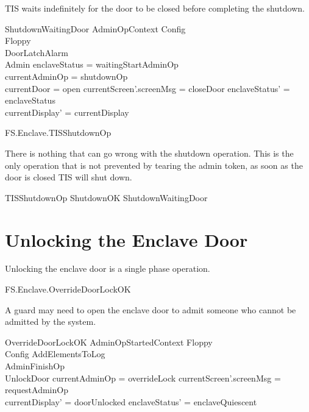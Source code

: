 TIS waits indefinitely for the door to be closed before completing the
shutdown. 

\begin{schema}{ShutdownWaitingDoor}
        AdminOpContext
\also   
        \Xi Config
\\      \Xi Floppy
\\      \Xi DoorLatchAlarm
\\      \Xi Admin
\where
        enclaveStatus = waitingStartAdminOp
\\      \The currentAdminOp = shutdownOp
\\      currentDoor = open
\also
        currentScreen'.screenMsg = closeDoor
\also
        enclaveStatus' = enclaveStatus
\\      currentDisplay' = currentDisplay
\end{schema}

\begin{traceunit}{FS.Enclave.TISShutdownOp}
\end{traceunit}

There is nothing that can go wrong with the shutdown operation. This
is the only operation that is not prevented by tearing the admin
token, as soon as the door is closed TIS will shut down.

\begin{zed}
        TISShutdownOp  ShutdownOK \lor ShutdownWaitingDoor
\end{zed}

\section{Unlocking the Enclave Door}

Unlocking the enclave door is a single phase operation.

\begin{traceunit}{FS.Enclave.OverrideDoorLockOK}
\end{traceunit}

A guard may need to open the enclave door to admit someone who cannot
be admitted by the system.

\begin{schema}{OverrideDoorLockOK}
        AdminOpStartedContext
\also   
        \Xi Floppy
\\      \Xi Config
\also
        AddElementsToLog
\\      AdminFinishOp
\\      UnlockDoor
\where
        \The currentAdminOp = overrideLock
\also
        currentScreen'.screenMsg = requestAdminOp
\\      currentDisplay' = doorUnlocked
\also
        enclaveStatus' = enclaveQuiescent
\end{schema}

